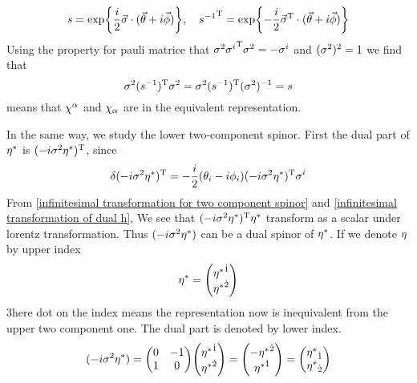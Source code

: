 \begin{equation}\label{finite transformation for upper two component spinor}
s = 
\exp{\frac{i}{2}\vec{\sigma}\cdot(\vec{\theta}+i\vec{\phi})},
\quad
{s^{-1}}^{\text{T}} = \exp{-\frac{i}{2}\vec{\sigma}^{\text{T}}\cdot(\vec{\theta}+i\vec{\phi})}
\end{equation}
Using the property for pauli matrice that $\sigma^2{\sigma^{i}}^{\text{T}}\sigma^2 =- \sigma^i$ and $(\sigma^2)^2 =1$ we find that 
\begin{equation}\label{equivalence of upper spinor with its dual space}
\sigma^2(s^{-1})^{\text{T}}\sigma^2 =\sigma^2(s^{-1})^{\text{T}}(\sigma^2)^{-1} =s
\end{equation}
means that $\chi^\alpha$ and $\chi_\alpha$ are in the equivalent representation.

In the same way, we study the lower two-component spinor. First the dual part of ${\eta^*}$ is $(-i\sigma^{2}{\eta^*})^{\text{T}}$, since
\begin{equation}\label{infinitesimal transformation of dual h}
\delta(-i\sigma^{2}{\eta^*})^{\text{T}} 
= -\frac{i}{2}(\theta_i-i\phi_i)(-i\sigma^2{\eta^*})^{\text{T}}\sigma^{i}
\end{equation} 
From \eqref{infinitesimal transformation for two component spinor} and \eqref{infinitesimal transformation of dual h}, We see that 
$(-i\sigma^{2}{\eta^*})^{\text{T}}{\eta^*}$ transform as a scalar under lorentz transformation. Thus $(-i\sigma^{2}{\eta^*})$ can be a dual spinor of ${\eta^*}$. If we denote $\eta$ by upper index
\begin{equation}
\lh = \mqty({\lh}^{\dot{1}} \\ {\lh}^{\dot{2}})
\end{equation}
3here dot on the index means the representation now is inequivalent from the upper two component one. The dual part is denoted by lower index.
\begin{equation}
(-i\s^2\lh) = \mqty(0 & -1 \\ 1 & 0) 
              \mqty(\lh^{\dot{1}}\\ \lh^{\dot{2}})
            = \mqty(-\lh^{\dot{2}}\\ \lh^{\dot{1}})
            = \mqty(\lh_{\dot{1}} \\ \lh_{\dot{2}})
\end{equation} 

